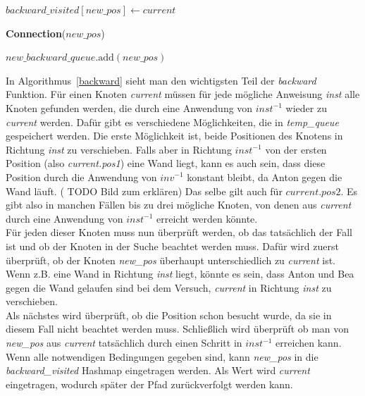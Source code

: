\documentclass[a4paper,10pt,ngerman]{scrartcl}
\begin{document}
\begin{algorithm}[H]
\begin{algorithmic}[1]
                        \State $\textit{backward\_visited}[\textit{new\_pos}] \gets \textit{current}$

                            \State \Return \textbf{Connection}($\textit{new\_pos}$)
                        \EndIf

                        \State $\textit{new\_backward\_queue}.\text{add}(\textit{new\_pos})$
                    \EndFor
                \EndFor
            \EndFunction
        \end{algorithmic}
    \end{algorithm}
    In Algorithmus~\ref{backward} sieht man den wichtigsten Teil der \textit{backward} Funktion. Für einen Knoten \textit{current} müssen für jede mögliche Anweisung \textit{inst} alle Knoten gefunden werden, die durch eine Anwendung von $\textit{inst}^{-1}$ wieder zu \textit{current} werden. Dafür gibt es verschiedene Möglichkeiten, die in \textit{temp\_queue} gespeichert werden. Die erste Möglichkeit ist, beide Positionen des Knotens in Richtung \textit{inst} zu verschieben. Falls aber in Richtung $\textit{inst}^{-1}$ von der ersten Position (also \textit{current.pos1}) eine Wand liegt, kann es auch sein, dass diese Position durch die Anwendung von $\textit{inv}^{-1}$ konstant bleibt, da Anton gegen die Wand läuft. (    TODO Bild zum erklären) Das selbe gilt auch für $\textit{current.pos2}$. Es gibt also in manchen Fällen bis zu drei mögliche Knoten, von denen aus \textit{current} durch eine Anwendung von $\textit{inst}^{-1}$ erreicht werden könnte. \\
    Für jeden dieser Knoten muss nun überprüft werden, ob das tatsächlich der Fall ist und ob der Knoten in der Suche beachtet werden muss. Dafür wird zuerst überprüft, ob der Knoten \textit{new\_pos} überhaupt unterschiedlich zu \textit{current} ist. Wenn z.B. eine Wand in Richtung \textit{inst} liegt, könnte es sein, dass Anton und Bea gegen die Wand gelaufen sind bei dem Versuch, \textit{current} in Richtung \textit{inst} zu verschieben. \\
    Als nächstes wird überprüft, ob die Position schon besucht wurde, da sie in diesem Fall nicht beachtet werden muss. Schließlich wird überprüft ob man von \textit{new\_pos} aus \textit{current} tatsächlich durch einen Schritt in $\textit{inst}^{-1}$ erreichen kann.\\
    Wenn alle notwendigen Bedingungen gegeben sind, kann \textit{new\_pos} in die \textit{backward\_visited} Hashmap eingetragen werden. Als Wert wird \textit{current} eingetragen, wodurch später der Pfad zurückverfolgt werden kann. \\
\end{document}
